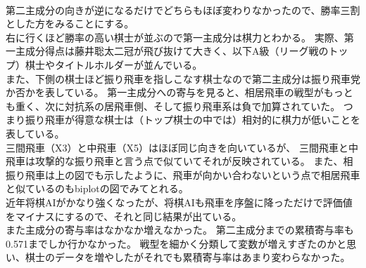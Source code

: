 \documentclass[11pt,a4paper,dvipdfmx]{jsarticle}
\begin{document}
\\
第二主成分の向きが逆になるだけでどちらもほぼ変わりなかったので、勝率三割とした方をみることにする。
\\
右に行くほど勝率の高い棋士が並ぶので第一主成分は棋力とわかる。
実際、第一主成分得点は藤井聡太二冠が飛び抜けて大きく、以下A級（リーグ戦のトップ）棋士やタイトルホルダーが並んでいる。
\\
また、下側の棋士ほど振り飛車を指しこなす棋士なので第二主成分は振り飛車党か否かを表している。
第一主成分への寄与を見ると、相居飛車の戦型がもっとも重く、次に対抗系の居飛車側、そして振り飛車系は負で加算されていた。
つまり振り飛車が得意な棋士は（トップ棋士の中では）相対的に棋力が低いことを表している。
\\
三間飛車（X3）と中飛車（X5）はほぼ同じ向きを向いているが、
三間飛車と中飛車は攻撃的な振り飛車と言う点で似ていてそれが反映されている。
また、相振り飛車は上の図でも示したように、飛車が向かい合わないという点で相居飛車と似ているのもbiplotの図でみてとれる。
\\
近年将棋AIがかなり強くなったが、将棋AIも飛車を序盤に降っただけで評価値をマイナスにするので、それと同じ結果が出ている。
\\
また主成分の寄与率はなかなか増えなかった。
第二主成分までの累積寄与率も0.571までしか行かなかった。
戦型を細かく分類して変数が増えすぎたのかと思い、棋士のデータを増やしたがそれでも累積寄与率はあまり変わらなかった。
\end{document}
